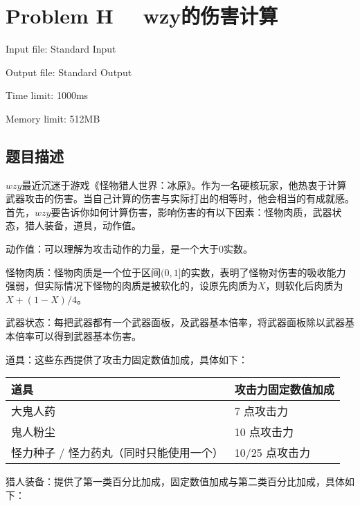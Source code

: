 \newpage
\section{Problem H \ \ wzy的伤害计算}
{ \limitfont{}
Input file: Standard Input \par
Output file: Standard Output \par
Time limit: 1000ms \par
Memory limit: 512MB \par
}
\subsection*{题目描述}

$wzy$最近沉迷于游戏《怪物猎人世界：冰原》。作为一名硬核玩家，他热衷于计算武器攻击的伤害。当自己计算的伤害与实际打出的相等时，他会相当的有成就感。
​首先，$wzy$要告诉你如何计算伤害，影响伤害的有以下因素：怪物肉质，武器状态，猎人装备，道具，动作值。

​动作值：可以理解为攻击动作的力量，是一个大于$0$实数。

怪物肉质：怪物肉质是一个位于区间$(0,1]$的实数，表明了怪物对伤害的吸收能力强弱，但实际情况下怪物的肉质是被软化的，设原先肉质为$X$，则软化后肉质为$X+(1-X)/4$。

​武器状态：每把武器都有一个武器面板，及武器基本倍率，将武器面板除以武器基本倍率可以得到武器基本伤害。

​道具：这些东西提供了攻击力固定数值加成，具体如下：

\begin{table}[H]
    \begin{tabularx}{\textwidth}{|X|X|}
    \hline
    \textbf{道具} & \textbf{攻击力固定数值加成} \\
    \hline
    {大鬼人药}         & {7 点攻击力} \\ \hline
    {鬼人粉尘}                  & {10 点攻击力}         \\ \hline
    {怪力种子 / 怪力药丸（同时只能使用一个）} & {10/25 点攻击力}      \\ \hline
    \end{tabularx}
\end{table}

​猎人装备：提供了第一类百分比加成，固定数值加成与第二类百分比加成，具体如下：

